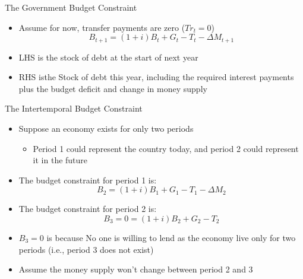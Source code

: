 \documentclass[aspectratio=1610]{beamer}
\begin{document}
\begin{frame}[wide]{The Government Budget Constraint}
	\begin{itemize}
		\item Assume for now, transfer payments are zero ($Tr_t = 0$)
		\[B_{t+1} = (1+i) B_t + G_t -T_t - \Delta M_{t+1}\]
		\vspace{2mm}
		\item LHS is the stock of debt at the start of next year 
		\vspace{4mm}
		\item RHS isthe Stock of debt this year, including the required interest payments plus the budget deficit and change in money supply
	\end{itemize}
\end{frame}
\begin{frame}[wide]{The Intertemporal Budget Constraint}
	\begin{itemize}
		\item Suppose an economy exists for only two periods
		\vspace{2mm}
		\begin{itemize}
			\item Period 1 could represent the country today, and period 2 could represent it in the future
		\end{itemize}
		\vspace{3mm}
		\item The budget constraint for period 1 is:
		\[B_2 = (1+i) B_1 +G_1 -T_1 - \Delta M_{2}\]
		\vspace{1mm}
		\item The budget constraint for period 2 is:
		\[B_3 = 0 = (1+i)B_2 +G_2 -T_2\]
		\vspace{1mm}
		\item $B_3=0$ is because No one is willing to lend as the economy live only for two periods (i.e., period 3 does not exist)
		\item Assume the money supply won't change between period 2 and 3
	\end{itemize}
\end{frame}
\end{document}
